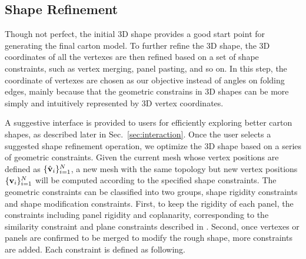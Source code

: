 


\subsection{Shape Refinement}\label{sec:refinement}

Though not perfect, the initial 3D shape provides a good start point for generating the final carton model. 
%
To further refine the 3D shape, the 3D coordinates of all the vertexes are then refined based on a set of shape constraints, such as vertex merging, panel pasting, and so on.
%
In this step, the coordinate of vertexes are chosen as our objective instead of angles on folding edges, mainly because that the geometric constrains in 3D shapes can be more simply and intuitively represented by 3D vertex coordinates.



A suggestive interface is provided to users for efficiently exploring better carton shapes, as described later in Sec.~\ref{sec:interaction}. 
%
Once the user selects a suggested shape refinement operation, we optimize the 3D shape based on a series of geometric constraints.
Given the current mesh whose vertex positions are defined as $\{\hat{\mathbf{v}}_i\}^{N}_{i=1}$, a new mesh with the same topology but new vertex positions $\{\mathbf{v}_i\}^{N}_{i=1}$ will be computed according to the specified shape constraints.
%
The geometric constraints can be classified into two groups, shape rigidity constraints and shape modification constraints.
% 
First, to keep the rigidity of each panel, the constraints including panel rigidity and coplanarity, corresponding to the similarity constraint and plane constraints described in \cite{Bouaziz:2012:SSD:2346796.2346802}. 
%
Second, once vertexes or panels are confirmed to be merged to modify the rough shape, more constraints are added. 
%
Each constraint is defined as following.  

